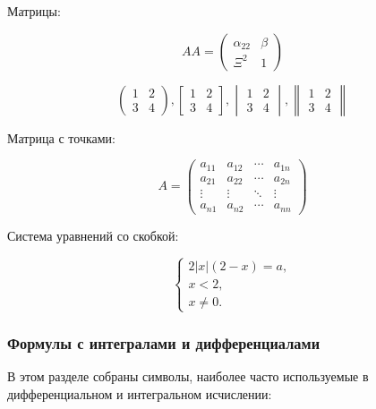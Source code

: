 \documentclass[
  a4paper,
]{book}
\theoremstyle{definition}
\theoremstyle{definition}
\theoremstyle{definition}
\theoremstyle{definition}
\theoremstyle{remark}
\begin{document}
Матрицы:

\[AA = \begin{pmatrix} \alpha_{22} & \beta\\
 \Xi^2 & 1
\end{pmatrix}\]

\[\begin{pmatrix} 1 & 2 \\ 3 & 4 \end{pmatrix},
\begin{bmatrix} 1 & 2 \\ 3 & 4 \end{bmatrix},
\begin{vmatrix} 1 & 2 \\ 3 & 4 \end{vmatrix},
\begin{Vmatrix} 1 & 2 \\ 3 & 4 \end{Vmatrix}\]

Матрица с точками:

\[A = \begin{pmatrix}
a_{11} & a_{12} & \cdots & a_{1n} \\
a_{21} & a_{22} & \cdots & a_{2n} \\
\vdots & \vdots & \ddots & \vdots \\
a_{n1} & a_{n2} & \cdots & a_{nn}
\end{pmatrix}\]

Система уравнений со скобкой:

\begin{equation*}
 \begin{cases}
   2 |x|(2 - x) = a, \\
   x < 2, \\
   x \ne 0.
 \end{cases}
\end{equation*}

\subsubsection{Формулы с интегралами и дифференциалами}\label{markdown-syntax-math-syms}

В этом разделе собраны символы, наиболее часто используемые в дифференциальном и интегральном исчислении:
\end{document}
